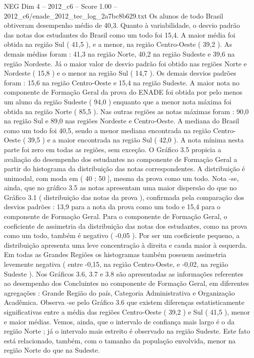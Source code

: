 \begin{textsample}{NEG Dim 4 – 2012\_c6 – Score 1.00 – 2012\_c6/enade\_2012\_tec\_log\_2a7bc8b629.txt}
Os alunos de todo Brasil obtiveram desempenho médio de 40,3.
Quanto à variabilidade, o desvio padrão das notas dos estudantes do Brasil como um todo foi 15,4.
A maior média foi obtida na região Sul ( 41,5 ), e a menor, na região Centro-Oeste ( 39,2 ).
As demais médias foram : 41,3 na região Norte, 40,2 na região Sudeste e 39,6 na região Nordeste.
Já o maior valor de desvio padrão foi obtido nas regiões Norte e Nordeste ( 15,8 ) e o menor na região Sul ( 14,7 ).
Os demais desvios padrões foram : 15,6 na região Centro-Oeste e 15,4 na região Sudeste.
A maior nota no componente de Formação Geral da prova do ENADE foi obtida por pelo menos um aluno da região Sudeste ( 94,0 ) enquanto que a menor nota máxima foi obtida na região Norte ( 85,5 ).
Nas outras regiões as notas máximas foram : 90,0 na região Sul e 89,0 nas regiões Nordeste e Centro-Oeste.
A mediana do Brasil como um todo foi 40,5, sendo a menor mediana encontrada na região Centro-Oeste ( 39,5 ) e a maior encontrada na região Sul ( 42,0 ).
A nota mínima nesta parte foi zero em todas as regiões, sem exceção.
O Gráfico 3.5 propicia a avaliação do desempenho dos estudantes no componente de Formação Geral a partir do histograma da distribuição das notas correspondentes.
A distribuição é unimodal, com moda em ( 40 ; 50 ], mesma da prova como um todo.
Nota -se, ainda, que no gráfico 3.5 as notas apresentam uma maior dispersão do que no Gráfico 3.1 ( distribuição das notas da prova ), confirmada pela comparação dos desvios padrões : 13,9 para a nota da prova como um todo e 15,4 para o componente de Formação Geral.
Para o componente de Formação Geral, o coeficiente de assimetria da distribuição das notas dos estudantes, como na prova como um todo, também é negativo ( -0,05 ).
Por ser um coeficiente pequeno, a distribuição apresenta uma leve concentração à direita e cauda maior à esquerda.
Em todas as Grandes Regiões os histogramas também possuem assimetria levemente negativa ( entre -0,15, na região Centro-Oeste, e -0,02, na região Sudeste ).
Nos Gráficos 3.6, 3.7 e 3.8 são apresentadas as informações referentes ao desempenho dos Concluintes no componente de Formação Geral, em diferentes agregações : Grande Região do país, Categoria Administrativa e Organização Acadêmica.
Observa -se pelo Gráfico 3.6 que existem diferenças estatisticamente significativas entre a média das regiões Centro-Oeste ( 39,2 ) e Sul ( 41,5 ), menor e maior médias.
Vemos, ainda, que o intervalo de confiança mais largo é o da região Norte ; já o intervalo mais estreito é observado na região Sudeste.
Este fato está relacionado, também, com o tamanho da população envolvida, menor na região Norte do que na Sudeste.

\end{textsample}
